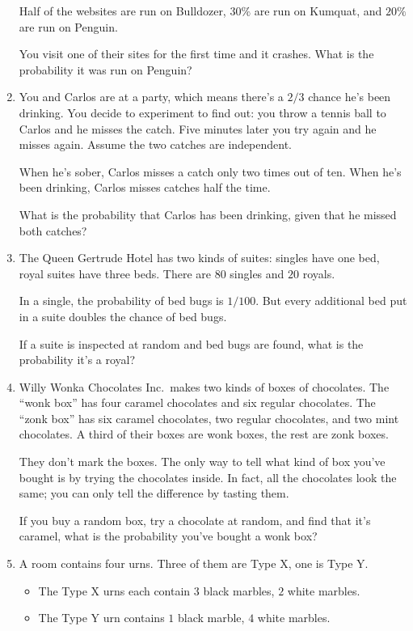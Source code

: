 \documentclass[justified]{tufte-book}
\providecommand{\tightlist}{%
  \setlength{\itemsep}{0pt}\setlength{\parskip}{0pt}}
\theoremstyle{definition}
\theoremstyle{definition}
\theoremstyle{definition}
\theoremstyle{remark}
\begin{document}
\begin{enumerate}
  Half of the websites are run on Bulldozer, \(30\%\) are run on Kumquat, and \(20\%\) are run on Penguin.

  You visit one of their sites for the first time and it crashes. What is the probability it was run on Penguin?
\item
  You and Carlos are at a party, which means there's a \(2/3\) chance he's been drinking. You decide to experiment to find out: you throw a tennis ball to Carlos and he misses the catch. Five minutes later you try again and he misses again. Assume the two catches are independent.

  When he's sober, Carlos misses a catch only two times out of ten. When he's been drinking, Carlos misses catches half the time.

  What is the probability that Carlos has been drinking, given that he missed both catches?
\item
  The Queen Gertrude Hotel has two kinds of suites: singles have one bed, royal suites have three beds. There are \(80\) singles and \(20\) royals.

  In a single, the probability of bed bugs is \(1/100\). But every additional bed put in a suite doubles the chance of bed bugs.

  If a suite is inspected at random and bed bugs are found, what is the probability it's a royal?
\item
  Willy Wonka Chocolates Inc.~makes two kinds of boxes of chocolates. The ``wonk box'' has four caramel chocolates and six regular chocolates. The ``zonk box'' has six caramel chocolates, two regular chocolates, and two mint chocolates. A third of their boxes are wonk boxes, the rest are zonk boxes.

  They don't mark the boxes. The only way to tell what kind of box you've bought is by trying the chocolates inside. In fact, all the chocolates look the same; you can only tell the difference by tasting them.

  If you buy a random box, try a chocolate at random, and find that it's caramel, what is the probability you've bought a wonk box?
\item
  A room contains four urns. Three of them are Type X, one is Type Y.

  \begin{itemize}
  \tightlist
  \item
    The Type X urns each contain \(3\) black marbles, \(2\) white marbles.
  \item
    The Type Y urn contains \(1\) black marble, \(4\) white marbles.
  \end{itemize}


\end{enumerate}
\end{document}
